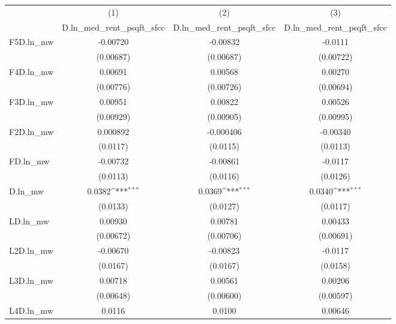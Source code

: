 {
\def\sym#1{\ifmmode^{#1}\else\(^{#1}\)\fi}
\begin{tabular}{l*{3}{c}}
\hline\hline
          &\multicolumn{1}{c}{(1)}&\multicolumn{1}{c}{(2)}&\multicolumn{1}{c}{(3)}\\
          &\multicolumn{1}{c}{D.ln\_med\_rent\_psqft\_sfcc}&\multicolumn{1}{c}{D.ln\_med\_rent\_psqft\_sfcc}&\multicolumn{1}{c}{D.ln\_med\_rent\_psqft\_sfcc}\\
\hline
F5D.ln\_mw & -0.00720         & -0.00832         &  -0.0111         \\
          &(0.00687)         &(0.00687)         &(0.00722)         \\
[1em]
F4D.ln\_mw &  0.00691         &  0.00568         &  0.00270         \\
          &(0.00776)         &(0.00726)         &(0.00694)         \\
[1em]
F3D.ln\_mw &  0.00951         &  0.00822         &  0.00526         \\
          &(0.00929)         &(0.00905)         &(0.00995)         \\
[1em]
F2D.ln\_mw & 0.000892         &-0.000406         & -0.00340         \\
          & (0.0117)         & (0.0115)         & (0.0113)         \\
[1em]
FD.ln\_mw  & -0.00732         & -0.00861         &  -0.0117         \\
          & (0.0113)         & (0.0116)         & (0.0126)         \\
[1em]
D.ln\_mw   &   0.0382\sym{***}&   0.0369\sym{***}&   0.0340\sym{***}\\
          & (0.0133)         & (0.0127)         & (0.0117)         \\
[1em]
LD.ln\_mw  &  0.00930         &  0.00781         &  0.00433         \\
          &(0.00672)         &(0.00706)         &(0.00691)         \\
[1em]
L2D.ln\_mw & -0.00670         & -0.00823         &  -0.0117         \\
          & (0.0167)         & (0.0167)         & (0.0158)         \\
[1em]
L3D.ln\_mw &  0.00718         &  0.00561         &  0.00206         \\
          &(0.00648)         &(0.00600)         &(0.00597)         \\
[1em]
L4D.ln\_mw &   0.0116         &   0.0100         &  0.00646         \\

\end{tabular}}

